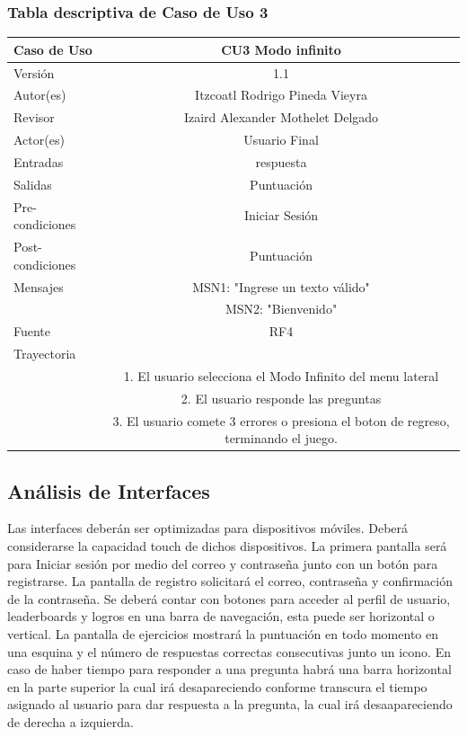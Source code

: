 \documentclass{article}
\begin{document}
\subsubsection{Tabla descriptiva de Caso de Uso 3}
\begin{tabular}{|M{5cm}|c|}
\hline
Caso de Uso & CU3 Modo infinito\\ \hline
Versión & 1.1\\ \hline
Autor(es) & Itzcoatl Rodrigo Pineda Vieyra\\ \hline
Revisor & Izaird Alexander Mothelet Delgado \\ \hline
Actor(es) & Usuario Final \\ \hline
Entradas &  respuesta \\ \hline
Salidas & Puntuación \\ \hline
Pre-condiciones & Iniciar Sesión \\ \hline
Post-condiciones & Puntuación\\ \hline
Mensajes & MSN1: "Ingrese un texto válido"\\
		   & MSN2: "Bienvenido"\\ \hline
Fuente & RF4 \\ \hline	
	Trayectoria\\
		& 1.	El usuario selecciona el Modo Infinito del menu lateral\\
		& 2.    El usuario responde  las preguntas \\
		& 3.	El usuario comete 3 errores o presiona el boton de regreso, terminando el juego.\\ \hline
\end{tabular}
\subsection{Análisis de Interfaces}
Las interfaces deberán ser optimizadas para dispositivos móviles. Deberá considerarse la capacidad touch de dichos dispositivos. La primera pantalla será para Iniciar sesión por medio del correo y contraseña junto con un botón para registrarse. La pantalla de registro solicitará el correo, contraseña y confirmación de la contraseña. Se deberá contar con botones para acceder al perfil de usuario, leaderboards y logros en una barra de navegación, esta puede ser horizontal o vertical. La pantalla de ejercicios mostrará la puntuación en todo momento en una esquina y el número de respuestas correctas consecutivas junto un icono. En caso de haber tiempo para responder a una pregunta habrá una barra horizontal en la parte superior la cual irá desapareciendo conforme transcura el tiempo asignado al usuario para dar respuesta a la pregunta, la cual irá  desaapareciendo de derecha a izquierda.
\end{document}
